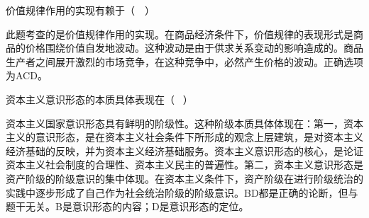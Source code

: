 \question 价值规律作用的实现有赖于（　）
\par{}
\begin{solution}此题考查的是价值规律作用的实现。在商品经济条件下，价值规律的表现形式是商品的价格围绕价值自发地波动。这种波动是由于供求关系变动的影响造成的。商品生产者之间展开激烈的市场竞争，在这种竞争中，必然产生价格的波动。正确选项为ACD。
\end{solution}
\question 资本主义意识形态的本质具体表现在（ ~）
\par{}
\begin{solution}资本主义国家意识形态具有鲜明的阶级性。这种阶级本质具体体现在：第一，资本主义的意识形态，是在资本主义社会条件下所形成的观念上层建筑，是对资本主义经济基础的反映，并为资本主义经济基础服务。资本主义意识形态的核心，是论证资本主义社会制度的合理性、资本主义民主的普遍性。第二，资本主义意识形态是资产阶级的阶级意识的集中体现。在资本主义条件下，资产阶级在进行阶级统治的实践中逐步形成了自己作为社会统治阶级的阶级意识。BD都是正确的论断，但与题干无关。B是意识形态的内容；D是意识形态的定位。
\end{solution}
